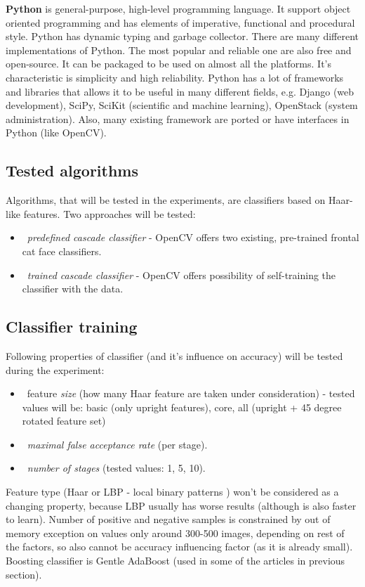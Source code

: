 \documentclass[hyperref]{acmtrans2e}
\begin{document}
\textbf{Python} is general-purpose, high-level programming language. It support object oriented programming and has elements of imperative, functional and procedural style. Python has dynamic typing and garbage collector. There are many different implementations of Python. The most popular and reliable one are also free and open-source. It can be packaged to be used on almost all the platforms. It's characteristic is simplicity and high reliability. Python has a lot of frameworks and libraries that allows it to be useful in many different fields, e.g. Django (web development), SciPy, SciKit (scientific and machine learning), OpenStack (system administration). Also, many existing framework are ported or have interfaces in Python (like OpenCV).
\subsection{Tested algorithms}
Algorithms, that will be tested in the experiments, are classifiers based on Haar-like features. Two approaches will be tested:
\begin{itemize}
\item~\emph{predefined cascade classifier} - OpenCV offers two existing, pre-trained frontal cat face classifiers. 
\item~\emph{trained cascade classifier} - OpenCV offers possibility of self-training the classifier with the data. 
\end{itemize}
\subsection{Classifier training}
Following properties of classifier (and it's influence on accuracy) will be tested during the experiment:
\begin{itemize}
\item~feature \emph{size} (how many Haar feature are taken under consideration) - tested values will be: basic (only upright features), core, all (upright + 45 degree rotated feature set)
\item~\emph{maximal false acceptance rate} (per stage).
\item~\emph{number of stages} (tested values: 1, 5, 10).
\end{itemize}
Feature type (Haar or LBP - local binary patterns \cite{lbp:2007}) won't be considered as a changing property, because LBP usually has worse results (although is also faster to learn). Number of positive and negative samples is constrained by out of memory exception on values only around 300-500 images, depending on rest of the factors, so also cannot be accuracy influencing factor (as it is already small). Boosting classifier is Gentle AdaBoost (used in some of the articles in previous section).
\end{document}
